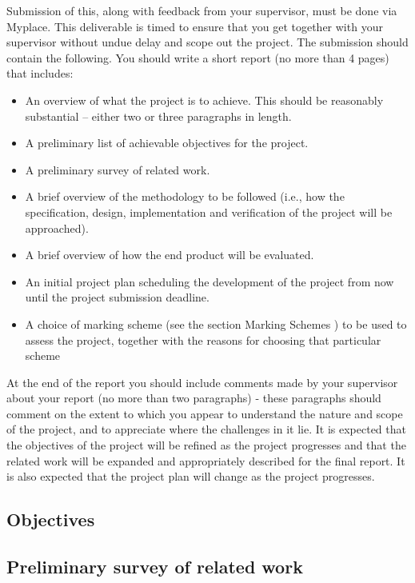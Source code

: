 \documentclass[a4paper]{report}
\begin{document}
\begin{paragraph}
Submission of this, along with feedback from your supervisor, must be done
via Myplace.
This deliverable is timed to ensure that you get together with your
supervisor without undue delay and scope out the project. 
The submission should contain the following.
You should write a short report (no more than 4 pages) that includes:
\begin{itemize}
\item An overview of what the project is to achieve. This should be reasonably substantial
 – either two or three paragraphs in length.
\item A preliminary list of achievable objectives for the project.
\item A preliminary survey of related work.
\item A brief overview of the methodology to be followed 
(i.e., how the specification, design, implementation and verification
 of the project will be approached).
\item A brief overview of how the end product will be evaluated.
\item An initial project plan scheduling the development of the project from now until the
project submission deadline.
\item A choice of marking scheme (see the section Marking Schemes ) to be used to assess the
project, together with the reasons for choosing that particular scheme
\end{itemize}

At the end of the report you should include comments made by your supervisor about your
report (no more than two paragraphs) - these paragraphs should comment on the extent
to which you appear to understand the nature and scope of the project, and to
appreciate where the challenges in it lie.
It is expected that the objectives of the project will be refined as the project
progresses and that the related work will be expanded and appropriately described
for the final report. It is also expected that the project plan will change as the
project progresses.
\end{paragraph}

\subsection{Objectives}
\subsection{Preliminary survey of related work}
\end{document}
